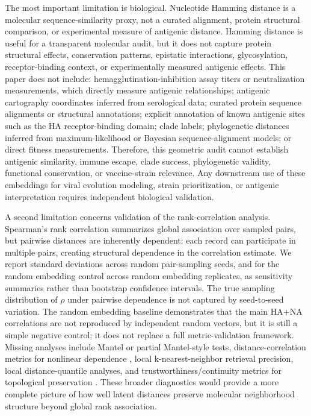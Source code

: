 \documentclass[11pt]{article}
\begin{document}
The most important limitation is biological. Nucleotide Hamming distance is a molecular sequence-similarity proxy, not a curated alignment, protein structural comparison, or experimental measure of antigenic distance. Hamming distance is useful for a transparent molecular audit, but it does not capture protein structural effects, conservation patterns, epistatic interactions, glycosylation, receptor-binding context, or experimentally measured antigenic effects. This paper does not include: hemagglutination-inhibition assay titers or neutralization measurements, which directly measure antigenic relationships; antigenic cartography coordinates inferred from serological data; curated protein sequence alignments or structural annotations; explicit annotation of known antigenic sites such as the HA receptor-binding domain; clade labels; phylogenetic distances inferred from maximum-likelihood or Bayesian sequence-alignment models; or direct fitness measurements. Therefore, this geometric audit cannot establish antigenic similarity, immune escape, clade success, phylogenetic validity, functional conservation, or vaccine-strain relevance. Any downstream use of these embeddings for viral evolution modeling, strain prioritization, or antigenic interpretation requires independent biological validation.

A second limitation concerns validation of the rank-correlation analysis. Spearman's rank correlation summarizes global association over sampled pairs, but pairwise distances are inherently dependent: each record can participate in multiple pairs, creating structural dependence in the correlation estimate. We report standard deviations across random pair-sampling seeds, and for the random embedding control across random embedding replicates, as sensitivity summaries rather than bootstrap confidence intervals. The true sampling distribution of $\rho$ under pairwise dependence is not captured by seed-to-seed variation. The random embedding baseline demonstrates that the main HA+NA correlations are not reproduced by independent random vectors, but it is still a simple negative control; it does not replace a full metric-validation framework. Missing analyses include Mantel or partial Mantel-style tests, distance-correlation metrics for nonlinear dependence \cite{szekely2007distance}, local k-nearest-neighbor retrieval precision, local distance-quantile analyses, and trustworthiness/continuity metrics for topological preservation \cite{lee2009quality}. These broader diagnostics would provide a more complete picture of how well latent distances preserve molecular neighborhood structure beyond global rank association.
\end{document}

